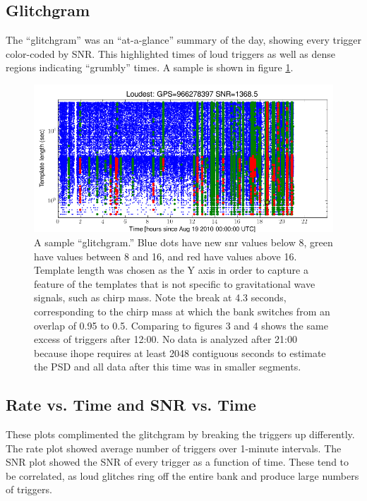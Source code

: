 \subsection{Glitchgram}

The ``glitchgram'' was an ``at-a-glance'' summary of the day, showing
every trigger color-coded by SNR.  This highlighted times of loud
triggers as well as dense regions indicating ``grumbly'' times.  A
sample is shown in figure \ref{f:daily_ihope_glitchgram}.

\begin{figure}
  \includegraphics[width=\linewidth]{figures/detchar/H1_1_UNCLUSTERED_glitchgram.png}
  \caption[The Aug 19th daily ihope ``glitchgram'']{
  \label{f:daily_ihope_glitchgram}
A sample ``glitchgram.'' Blue dots have
new snr values below 8, green have values between 8 and 16,
and red have values above 16.  Template length was chosen as the Y
axis in order to capture a feature of the templates that is not
specific to gravitational wave signals, such as chirp mass.
Note the break at 4.3 seconds, corresponding to the
chirp mass at which the bank switches from an overlap of 0.95 to 0.5.
Comparing to figures 3 and 4 shows the same 
excess of triggers after 12:00.  No data is analyzed after 21:00
because ihope requires at least 2048 contiguous seconds to estimate
the PSD and all data after this time was in smaller segments.}
\end{figure}%


\subsection{Rate vs. Time and SNR vs. Time}

These plots complimented the glitchgram by breaking the triggers up
differently.  The rate plot showed average number of triggers over
1-minute intervals.  The SNR plot showed the SNR of every trigger as a
function of time.  These tend to be correlated, as loud glitches ring
off the entire bank and produce large numbers of triggers.


